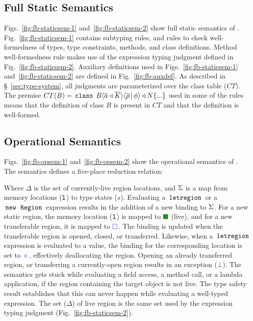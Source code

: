 \subsection{Full Static Semantics}




Figs.~\ref{fig:fb-staticsem-1} and~\ref{fig:fb-staticsem-2} show full
static semantics of \FB. Fig.~\ref{fig:fb-staticsem-1} contains subtyping
rules, and rules to check well-formedness of \FB types, type
constraints, methods, and class definitions. Method well-formedness
rule makes use of the expression typing judgment defined in
Fig.~\ref{fig:fb-staticsem-2}. Auxiliary definitions used in
Figs.~\ref{fig:fb-staticsem-1} and~\ref{fig:fb-staticsem-2} are
defined in Fig.~\ref{fig:fb-auxdef}. As described in
\S~\ref{sec:type-system}, all judgments are parameterized over the
class table ($CT$). The premise $CT(B) = \,{\tt class}\,\; B\langle \overline{a} \triangleleft \overline{K} \rangle\langle \overline{\rho} \,|\, \phi \rangle \triangleleft N\{...\}$
used in some of the rules means that the definition of class $B$ is
present in $CT$ and that the definition is well-formed.

\subsection{Operational Semantics}


Figs.~\ref{fig:fb-opsem-1} and~\ref{fig:fb-opsem-2} show the
operational semantics of \fbname. The semantics defines a five-place
reduction relation:
\begin{smathpar}
\end{smathpar}
Where $\Delta$ is the set of currently-live region locations, and
$\Sigma$ is a map from memory locations ($\mathtt{l}$) to type states ($s$).
Evaluating a $\,{\tt letregion}\,$ or a $\,{\tt new}\,\;\,{\tt Region}\,$ expression
results in the addition of a new binding to $\Sigma$. For a new static
region, the memory location ($\mathtt{l}$) is mapped to $\LIVE$ (live), and
for a new transferable region, it is mapped to ${\color{blue} \square}$. The binding is
updated when the transferable region is opened, closed, or
transferred. Likewise, when a $\,{\tt letregion}\,$ expression is evaluated
to a value, the binding for the corresponding location is set to
${\color{blue}\times}$, effectively deallocating the region. Opening an already
transferred region, or transferring a currently-open region results in
an exception ($\bot$). The semantics gets stuck while evaluating a
field access, a method call, or a lambda application, if the region
containing the target object is not live. The type safety result
establishes that this can never happen while evaluating a well-typed
expression. The set ($\Delta$) of live region is the same set used by
the expression typing judgment (Fig.~\ref{fig:fb-staticsem-2}). 








